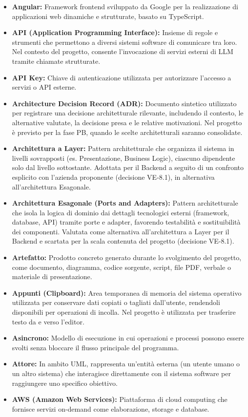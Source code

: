 \begin{itemize}[leftmargin=*]
      analisi dei requisiti. Attivo dalla baseline RTB.
      \item \textbf{Angular:} Framework frontend sviluppato da Google per la realizzazione di applicazioni web dinamiche e strutturate, basato su TypeScript.
      \item \textbf{API (Application Programming Interface):} Insieme di regole e strumenti che permettono a diversi sistemi software di comunicare tra loro. Nel contesto del progetto, consente l'invocazione di servizi esterni di LLM tramite chiamate strutturate.
      \item \textbf{API Key:} Chiave di autenticazione utilizzata per autorizzare l’accesso a servizi o API esterne.
      \item \textbf{Architecture Decision Record (ADR):} Documento sintetico utilizzato per registrare una decisione architetturale rilevante, includendo il contesto, le alternative valutate, la decisione presa e le relative motivazioni. Nel progetto è previsto per la fase PB, quando le scelte architetturali saranno consolidate.
      \item \textbf{Architettura a Layer:} Pattern architetturale che organizza il sistema in livelli sovrapposti (es. Presentazione, Business Logic), ciascuno dipendente solo dal livello sottostante. Adottata per il Backend a seguito di un confronto esplicito con l'azienda proponente (decisione VE-8.1), in alternativa all'architettura Esagonale.
      \item \textbf{Architettura Esagonale (Ports and Adapters):} Pattern architetturale che isola la logica di dominio dai dettagli tecnologici esterni (framework, database, API) tramite porte e adapter, favorendo testabilità e sostituibilità dei componenti. Valutata come alternativa all'architettura a Layer per il Backend e scartata per la scala contenuta del progetto (decisione VE-8.1).
      \item \textbf{Artefatto:} Prodotto concreto generato durante lo svolgimento del progetto, come documento, diagramma, codice sorgente, script, file PDF, verbale o materiale di presentazione.
      \item \textbf{Appunti (Clipboard):} Area temporanea di memoria del sistema operativo utilizzata per conservare dati copiati o tagliati dall'utente, rendendoli disponibili per operazioni di incolla. Nel progetto è utilizzata per trasferire testo da e verso l'editor.
      \item \textbf{Asincrono:} Modello di esecuzione in cui operazioni e processi possono essere svolti senza bloccare il flusso principale del programma.   
      \item \textbf{Attore:} In ambito UML, rappresenta un'entità esterna (un utente umano o un altro sistema) che interagisce direttamente con il sistema software per raggiungere uno specifico obiettivo.
      \item \textbf{AWS (Amazon Web Services):} Piattaforma di cloud computing che fornisce servizi on-demand come elaborazione, storage e database.
      \end{itemize}
 
